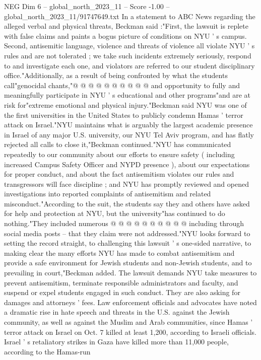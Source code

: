 \begin{textsample}{NEG Dim 6 – global\_north\_2023\_11 – Score -1.00 – global\_north\_2023\_11/91747649.txt}
In a statement to ABC News regarding the alleged verbal and physical threats, Beckman said :"First, the lawsuit is replete with false claims and paints a bogus picture of conditions on NYU ' s campus.
Second, antisemitic language, violence and threats of violence all violate NYU ' s rules and are not tolerated ; we take such incidents extremely seriously, respond to and investigate each one, and violators are referred to our student disciplinary office."Additionally, as a result of being confronted by what the students call"genocidal chants,"@ @ @ @ @ @ @ @ @ @ and opportunity to fully and meaningfully participate in NYU ' s educational and other programs"and are at risk for"extreme emotional and physical injury."Beckman said NYU was one of the first universities in the United States to publicly condemn Hamas ' terror attack on Israel."NYU maintains what is arguably the largest academic presence in Israel of any major U.S. university, our NYU Tel Aviv program, and has flatly rejected all calls to close it,"Beckman continued."NYU has communicated repeatedly to our community about our efforts to ensure safety ( including increased Campus Safety Officer and NYPD presence ), about our expectations for proper conduct, and about the fact antisemitism violates our rules and transgressors will face discipline ; and NYU has promptly reviewed and opened investigations into reported complaints of antisemitism and related misconduct."According to the suit, the students say they and others have asked for help and protection at NYU, but the university"has continued to do nothing."They included numerous @ @ @ @ @ @ @ @ @ @ including through social media posts -- that they claim were not addressed."NYU looks forward to setting the record straight, to challenging this lawsuit ' s one-sided narrative, to making clear the many efforts NYU has made to combat antisemitism and provide a safe environment for Jewish students and non-Jewish students, and to prevailing in court,"Beckman added.
The lawsuit demands NYU take measures to prevent antisemitism, terminate responsible administrators and faculty, and suspend or expel students engaged in such conduct.
They are also asking for damages and attorneys ' fees.
Law enforcement officials and advocates have noted a dramatic rise in hate speech and threats in the U.S. against the Jewish community, as well as against the Muslim and Arab communities, since Hamas ' terror attack on Israel on Oct. 7 killed at least 1,200, according to Israeli officials.
Israel ' s retaliatory strikes in Gaza have killed more than 11,000 people, according to the Hamas-run

\end{textsample}
